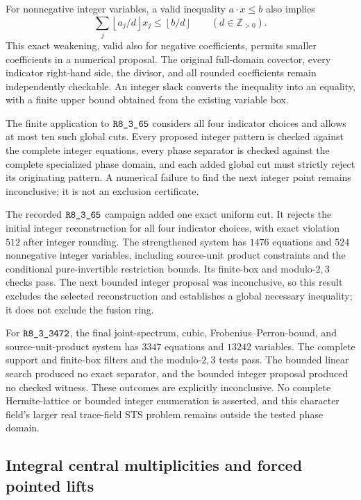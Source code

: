 For nonnegative integer variables, a valid inequality $a\cdot x\le b$
also implies
\[
 \sum_j\left\lfloor a_j/d\right\rfloor x_j
 \le\left\lfloor b/d\right\rfloor\qquad(d\in\mathbb Z_{>0}).
\]
This exact weakening, valid also for negative coefficients, permits
smaller coefficients in a numerical proposal.  The original full-domain
covector, every indicator right-hand side, the divisor, and all rounded
coefficients remain independently checkable.  An integer slack converts
the inequality into an equality, with a finite upper bound obtained
from the existing variable box.

The finite application to $\sha{R8_3_65}$ considers all four indicator
choices and allows at most ten such global cuts.  Every proposed integer
pattern is checked against the complete integer equations, every phase
separator is checked against the complete specialized phase domain, and
each added global cut must strictly reject its originating pattern.
A numerical failure to find the next integer point remains inconclusive;
it is not an exclusion certificate.

The recorded $\sha{R8_3_65}$ campaign added one exact uniform cut.  It
rejects the initial integer reconstruction for all four indicator
choices, with exact violation $512$ after integer rounding.  The
strengthened system has $1476$ equations and $524$ nonnegative integer
variables, including source-unit product constraints and the conditional
pure-invertible restriction bounds.  Its finite-box and modulo-$2,3$
checks pass.  The next bounded integer proposal was inconclusive, so
this result excludes the selected reconstruction and establishes a
global necessary inequality; it does not exclude the fusion ring.

For $\sha{R8_3_3472}$, the final joint-spectrum, cubic, Frobenius--Perron-bound,
and source-unit-product system has $3347$ equations and $13242$ variables.
The complete support and finite-box filters and the modulo-$2,3$ tests
pass.  The bounded linear search produced no exact separator, and the
bounded integer proposal produced no checked witness.  These outcomes
are explicitly inconclusive.  No complete Hermite-lattice or bounded
integer enumeration is asserted, and this character field's larger
real trace-field STS problem remains outside the tested phase domain.

\subsection{Integral central multiplicities and forced pointed lifts}
\label{subsec:frontier-quartic-integer}

